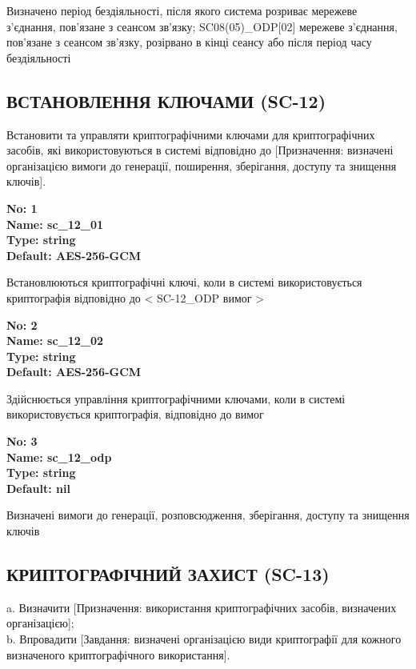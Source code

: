 \documentclass{article}
\begin{document}
{\footnotesize Визначено період бездіяльності, після якого система розриває мережеве з'єднання, пов'язане з сеансом зв'язку; SC08(05)\_\allowbreak{}ODP[02] мережеве з'єднання, пов'язане з сеансом зв'язку, розірвано в кінці сеансу або після період часу бездіяльності}




\subsection{ВСТАНОВЛЕННЯ КЛЮЧАМИ (SC-12)}
Встановити та управляти криптографічними ключами для криптографічних засобів, які використовуються в системі відповідно до [Призначення: визначені організацією вимоги до генерації, поширення, зберігання, доступу та знищення ключів].

\vspace{10pt}
{\footnotesize\bfseries
No: 1\\
Name: sc\_\allowbreak{}12\_\allowbreak{}01\\
Type: string\\
Default: \textquotedbl{}AES-256-GCM\textquotedbl{}
}

{\footnotesize Встановлюються криптографічні ключі, коли в системі використовується криптографія відповідно до < SC-12\_\allowbreak{}ODP вимог >}


{\footnotesize\bfseries
No: 2\\
Name: sc\_\allowbreak{}12\_\allowbreak{}02\\
Type: string\\
Default: \textquotedbl{}AES-256-GCM\textquotedbl{}
}

{\footnotesize Здійснюється управління криптографічними ключами, коли в системі використовується криптографія, відповідно до вимог }


{\footnotesize\bfseries
No: 3\\
Name: sc\_\allowbreak{}12\_\allowbreak{}odp\\
Type: string\\
Default: nil
}

{\footnotesize Визначені вимоги до генерації, розповсюдження, зберігання, доступу та знищення ключів}




\subsection{КРИПТОГРАФІЧНИЙ ЗАХИСТ (SC-13)}
a. Визначити [Призначення: використання криптографічних засобів, визначених організацією];\\ 
b. Впровадити [Завдання: визначені організацією види криптографії для кожного визначеного криптографічного використання].
\end{document}
